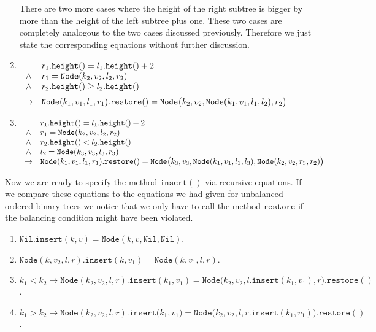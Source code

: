 \begin{enumerate}
      There are two more cases where the height of the right subtree is bigger by more than 
      the height of the left subtree plus one.  These two cases are completely analogous to the two
      cases discussed previously.  Therefore we just state the corresponding equations without
      further discussion.
\item $\begin{array}[t]{cl}
              & r_1.\mathtt{height}() = l_1.\mathtt{height}() + 2    \\ 
       \wedge & r_1 = \mathtt{Node}(k_2,v_2,l_2,r_2)               \\
       \wedge & r_2.\mathtt{height}() \geq l_2.\mathtt{height}()     \\[0.2cm]
       \rightarrow & \mathtt{Node}(k_1,v_1,l_1,r_1).\mathtt{restore}() = 
                     \mathtt{Node}\bigl(k_2,v_2,\mathtt{Node}(k_1,v_1,l_1,l_2),r_2\bigr)
       \end{array}
      $
\item $\begin{array}[t]{cl}
               & r_1.\mathtt{height}() = l_1.\mathtt{height}() + 2    \\ 
        \wedge & r_1 = \mathtt{Node}(k_2,v_2,l_2,r_2)               \\
        \wedge & r_2.\mathtt{height}() < l_2.\mathtt{height}()     \\
        \wedge & l_2 = \mathtt{Node}(k_3,v_3,l_3,r_3)               \\
        \rightarrow & \mathtt{Node}(k_1,v_1,l_1,r_1).\mathtt{restore}() = 
                      \mathtt{Node}\bigl(k_3,v_3,\mathtt{Node}(k_1,v_1,l_1,l_3),\mathtt{Node}(k_2,v_2,r_3,r_2) \bigr)
        \end{array}
       $

\end{enumerate}
Now we are ready to specify the method  $\mathtt{insert}()$ via recursive equations.
If we compare these equations to the equations we had given for unbalanced ordered binary trees we
notice that we only have to call the method $\mathtt{restore}$ if the balancing condition might have
been violated.
\begin{enumerate}
\item $\mathtt{Nil}.\mathtt{insert}(k,v) = \mathtt{Node}(k,v, \mathtt{Nil}, \mathtt{Nil})$.  
\item $\mathtt{Node}(k, v_2, l, r).\mathtt{insert}(k,v_1) = \mathtt{Node}(k, v_1, l, r)$.
\item $k_1 < k_2 \rightarrow 
          \mathtt{Node}(k_2, v_2, l, r).\mathtt{insert}(k_1, v_1) =
          \mathtt{Node}\bigl(k_2, v_2, l.\mathtt{insert}(k_1,v_1), r\bigr).\mathtt{restore}()$.
\item $k_1 > k_2 \rightarrow 
         \mathtt{Node}(k_2, v_2, l, r).\mathtt{insert}\bigl(k_1, v_1\bigr) = 
         \mathtt{Node}\bigl(k_2, v_2, l, r.\mathtt{insert}(k_1,v_1)\bigr).\mathtt{restore}()$.
\end{enumerate}

